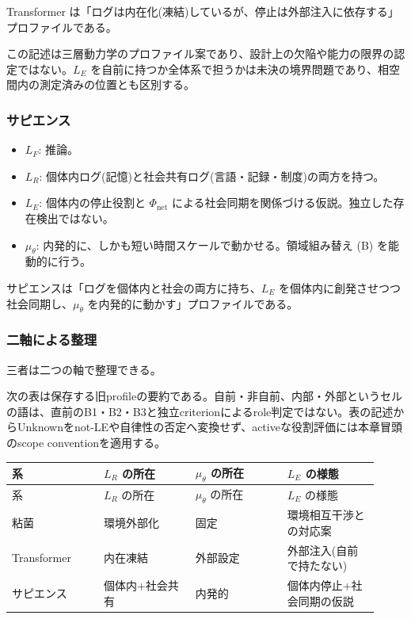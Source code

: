 Transformer は「ログは内在化(凍結)しているが、停止は外部注入に依存する」プロファイルである。

この記述は三層動力学のプロファイル案であり、設計上の欠陥や能力の限界の認定ではない。$L_E$ を自前に持つか全体系で担うかは未決の境界問題であり、相空間内の測定済みの位置とも区別する。

\subsubsection{サピエンス}


\begin{itemize}
\item \textbf{$L_F$}: 推論。
\item \textbf{$L_R$}: 個体内ログ(記憶)と社会共有ログ(言語・記録・制度)の両方を持つ。
\item \textbf{$L_E$}: 個体内の停止役割と $\Phi_{\text{net}}$ による社会同期を関係づける仮説。独立した存在検出ではない。
\item \textbf{$\mu_\theta$}: 内発的に、しかも短い時間スケールで動かせる。領域組み替え (B) を能動的に行う。
\end{itemize}


サピエンスは「ログを個体内と社会の両方に持ち、$L_E$ を個体内に創発させつつ社会同期し、$\mu_\theta$ を内発的に動かす」プロファイルである。

\subsubsection{二軸による整理}


三者は二つの軸で整理できる。

次の表は保存する旧profileの要約である。自前・非自前、内部・外部というセルの語は、直前のB1・B2・B3と独立criterionによるrole判定ではない。表の記述からUnknownをnot-LEや自律性の否定へ変換せず、activeな役割評価には本章冒頭のscope conventionを適用する。

\begin{longtable}{@{}p{0.23\linewidth}p{0.23\linewidth}p{0.23\linewidth}p{0.23\linewidth}@{}}
\toprule
系 & $L_R$ の所在 & $\mu_\theta$ の所在 & $L_E$ の様態 \\
\midrule
\endfirsthead
\toprule
系 & $L_R$ の所在 & $\mu_\theta$ の所在 & $L_E$ の様態 \\
\midrule
\endhead
粘菌 & 環境外部化 & 固定 & 環境相互干渉との対応案 \\
Transformer & 内在凍結 & 外部設定 & 外部注入(自前で持たない) \\
サピエンス & 個体内+社会共有 & 内発的 & 個体内停止+社会同期の仮説 \\
\bottomrule
\end{longtable}


